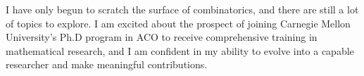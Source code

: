 \documentclass[12pt]{article}
\begin{document}
I have only begun to scratch the surface of combinatorics, and there are still a lot of topics to
explore. I am excited about the prospect of joining Carnegie Mellon University's Ph.D program in ACO
to receive comprehensive training in mathematical research, and I am confident in my ability to
evolve into a capable researcher and make meaningful contributions.  

\newpage



\end{document}
